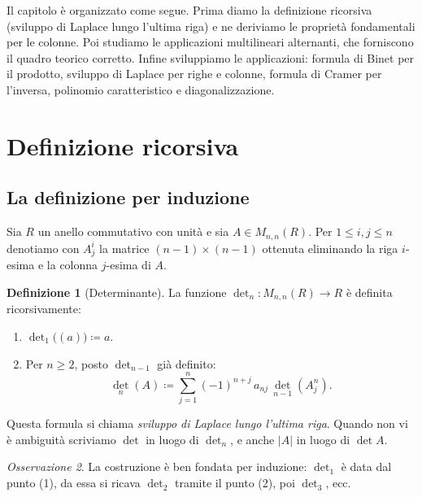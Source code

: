 \documentclass[11pt, a4paper]{book}
\theoremstyle{definition}
\newtheorem{definizione}{Definizione}[section]
\theoremstyle{plain}
\theoremstyle{remark}
\newtheorem{osservazione}[definizione]{Osservazione}
\begin{document}
Il capitolo è organizzato come segue. Prima diamo la definizione ricorsiva (sviluppo di Laplace lungo l'ultima riga) e ne deriviamo le proprietà fondamentali per le colonne. Poi studiamo le applicazioni multilineari alternanti, che forniscono il quadro teorico corretto. Infine sviluppiamo le applicazioni: formula di Binet per il prodotto, sviluppo di Laplace per righe e colonne, formula di Cramer per l'inversa, polinomio caratteristico e diagonalizzazione.

\section{Definizione ricorsiva}
\label{sec:det-def}

\subsection{La definizione per induzione}

Sia $R$ un anello commutativo con unità e sia $A \in M_{n,n}(R)$. Per $1 \leq i,j \leq n$ denotiamo con $A^i_j$ la matrice $(n-1)\times(n-1)$ ottenuta eliminando la riga $i$-esima e la colonna $j$-esima di $A$.

\begin{defbox}
\begin{definizione}[Determinante]
\label{def:determinante}
La funzione $\det_n \colon M_{n,n}(R) \to R$ è definita ricorsivamente:
\begin{enumerate}
  \item $\det_1\bigl((a)\bigr) \coloneqq a$.
  \item Per $n \geq 2$, posto $\det_{n-1}$ già definito:
  \[
    \det_n(A) \coloneqq \sum_{j=1}^{n} (-1)^{n+j}\, a_{nj}\, \det_{n-1}(A^n_j).
  \]
\end{enumerate}
Questa formula si chiama \emph{sviluppo di Laplace lungo l'ultima riga}. Quando non vi è ambiguità scriviamo $\det$ in luogo di $\det_n$, e anche $|A|$ in luogo di $\det A$.
\end{definizione}
\end{defbox}

\begin{osservazione}
La costruzione è ben fondata per induzione: $\det_1$ è data dal punto (1), da essa si ricava $\det_2$ tramite il punto (2), poi $\det_3$, ecc.
\end{osservazione}
\end{document}
